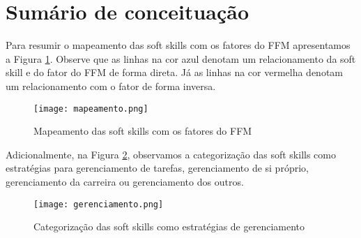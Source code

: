 \section{Sumário de conceituação}

Para resumir o mapeamento das soft skills com os fatores do FFM apresentamos a Figura \ref{fig:mapeamento}. Observe que as linhas na cor azul denotam um relacionamento da soft skill e do fator do FFM de forma direta. Já as linhas na cor vermelha denotam um relacionamento com o fator de forma inversa.

\begin{figure}[ht]
\centering
\caption{\small Mapeamento das soft skills com os fatores do FFM} 
\texttt{[image: mapeamento.png]}
\label{fig:mapeamento}
\end{figure}

Adicionalmente, na Figura \ref{fig:gerenciamento}, observamos a categorização das soft skills como estratégias para gerenciamento de tarefas, gerenciamento de si próprio, gerenciamento da carreira ou gerenciamento dos outros.

\begin{figure}[ht]
\centering
\caption{\small Categorização das soft skills como estratégias de gerenciamento} %
\texttt{[image: gerenciamento.png]}
\label{fig:gerenciamento}
\end{figure}